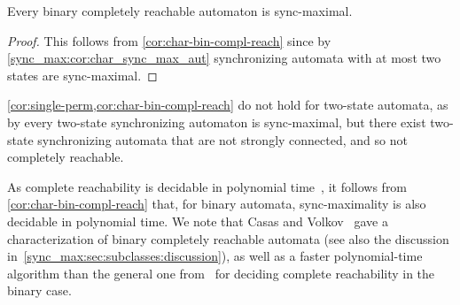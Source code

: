 \begin{corollary} \label{cor:bin-compl-reach-sync-maximal}
	Every binary completely reachable automaton is sync-maximal.
\end{corollary}
\begin{proof}
	This follows from \cref{cor:char-bin-compl-reach} 
	since by \cref{sync_max:cor:char_sync_max_aut} 
	synchronizing automata with at most two states are sync-maximal.
\end{proof}

\cref{cor:single-perm,cor:char-bin-compl-reach}
do not hold for two-state automata,
as by  
every two-state synchronizing automaton is sync-maximal,
but there exist two-state synchronizing automata that are not strongly
connected, and so not completely reachable.

As complete reachability is decidable in polynomial time~\cite{DBLP:conf/icalp/FerensS23}, it follows from \cref{cor:char-bin-compl-reach} that, for binary automata, sync-maximality is also decidable in polynomial time. We note that Casas and Volkov~\cite{DBLP:conf/latin/CasasV22} gave a characterization of binary completely reachable automata (see also the discussion in~\cref{sync_max:sec:subclasses:discussion}), as well as a faster polynomial-time algorithm than the general one from~\cite{DBLP:conf/icalp/FerensS23} for deciding complete reachability in the binary case.